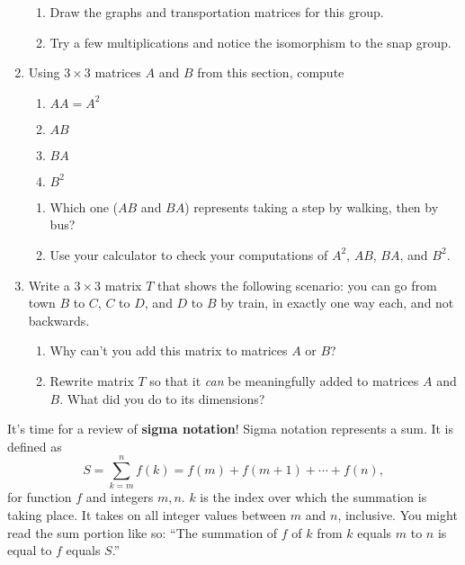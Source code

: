 \documentclass[../gatm.tex]{subfiles}
\begin{document}
\begin{enumerate}
\begin{enumerate}
\item Draw the graphs and transportation matrices for this group.
\item Try a few multiplications and notice the isomorphism to the snap group.
\end{enumerate}
\item Using $3\times 3$ matrices $A$ and $B$ from this section, compute
\begin{multicols}{4}
\begin{enumerate}
\item $AA=A^2$
\item $AB$
\item $BA$
\item $B^2$
\setcounter{mtrx_mult_problem_ii}{\value{enumii}}
\end{enumerate}
\end{multicols}
\begin{enumerate}
\setcounter{enumii}{\value{mtrx_mult_problem_ii}}
\item Which one ($AB$ and $BA$) represents taking a step by walking, then by bus?
\item Use your calculator to check your computations of $A^2$, $AB$, $BA$, and $B^2$.
\end{enumerate}
\item Write a $3\times 3$ matrix $T$ that shows the following scenario: you can go from town $B$ to $C$, $C$ to $D$, and $D$ to $B$ by train, in exactly one way each, and not backwards.
\begin{enumerate}
\item Why can't you add this matrix to matrices $A$ or $B$?
\item Rewrite matrix $T$ so that it \textit{can} be meaningfully added to matrices $A$ and $B$. What did you do to its dimensions?
\end{enumerate}
\setcounter{mtrx_mult_problem_i}{\value{enumi}}
\end{enumerate}

\noindent It's time for a review of \textbf{sigma notation}! Sigma notation represents a sum. It is defined as
$$S=\sum_{k=m}^{n} f(k)=f(m)+f(m+1)+\cdots + f(n),$$
for function $f$ and integers $m,n$. $k$ is the index over which the summation is taking place. It takes on all integer values between $m$ and $n$, inclusive. You might read the sum portion like so: ``The summation of $f$ of $k$ from $k$ equals $m$ to $n$ is equal to $f$ equals $S$.''
\end{document}
